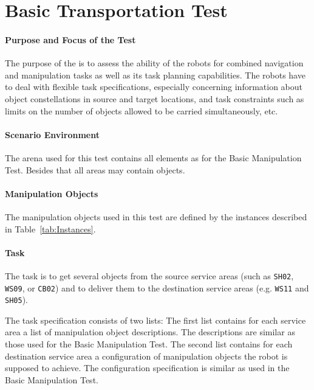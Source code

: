 \newpage
\section{Basic Transportation Test}
\label{sec:Basic Transportation Test}

\paragraph{Purpose and Focus of the Test}
The purpose of the  is to assess the ability of the robots for combined navigation and manipulation tasks as well as its task planning capabilities.
The robots have to deal with flexible task specifications, especially concerning information about object constellations in source and target locations, and task constraints such as limits on the number of objects allowed to be carried simultaneously, etc.

\paragraph{Scenario Environment}
The arena used for this test contains all elements as for the Basic Manipulation Test. Besides that all areas may contain objects.

\paragraph{Manipulation Objects}
The manipulation objects used in this test are defined by the instances described in Table~\ref{tab:Instances}.

\paragraph{Task}
The task is to get several objects from the source service areas (such as \texttt{SH02}, \texttt{WS09}, or \texttt{CB02}) and to deliver them to the destination service areas (e.g. \texttt{WS11} and \texttt{SH05}). 
\par
The task specification consists of two lists: The first list contains for each service area a list of manipulation object descriptions. The descriptions are similar as those used for the Basic Manipulation Test. The second list contains for each destination service area a configuration of manipulation objects the robot is supposed to achieve. The configuration specification is similar as used in the Basic Manipulation Test. 

